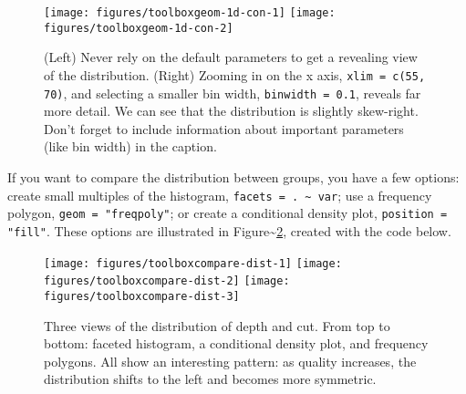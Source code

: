 \begin{figure}
\texttt{[image: figures/toolboxgeom-1d-con-1]} \texttt{[image: figures/toolboxgeom-1d-con-2]} \caption{(Left) Never rely on the default parameters to get a revealing view of the distribution.  (Right) Zooming in on the x axis, \texttt{xlim = c(55, 70)}, and selecting a smaller bin width, \texttt{binwidth = 0.1}, reveals far more detail. We can see that the distribution is slightly skew-right. Don't forget to include information about important parameters (like bin width) in the caption.\label{fig:geom-1d-con}}
\end{figure}

If you want to compare the distribution between groups, you have a few
options: create small multiples of the histogram,
\texttt{facets = . \textasciitilde{} var}; use a frequency polygon,
\texttt{geom = "freqpoly"}; or create a conditional density plot,
\texttt{position = "fill"}. These options are illustrated in
Figure\textasciitilde{}\ref{fig:compare-dist}, created with the code
below.  
 

\begin{Shaded}
\begin{Highlighting}[]
\StringTok{ }\StringTok{ }\NormalTok{(}\NormalTok{, }\NormalTok{)}
\StringTok{ }
\StringTok{  }\NormalTok{(}\NormalTok{(}  \NormalTok{) +}
\StringTok{  }\StringTok{ }
\StringTok{ }\NormalTok{(}\NormalTok{(}  \NormalTok{, }
   \NormalTok{)}
\StringTok{ }\NormalTok{(}\NormalTok{(}  
   \NormalTok{) }
\end{Highlighting}
\end{Shaded}

\begin{figure}
\texttt{[image: figures/toolboxcompare-dist-1]} \texttt{[image: figures/toolboxcompare-dist-2]} \texttt{[image: figures/toolboxcompare-dist-3]} \caption{Three views of the distribution of depth and cut. From top to bottom: faceted histogram, a conditional density plot, and frequency polygons. All show an interesting pattern: as quality increases, the distribution shifts to the left and becomes more symmetric.\label{fig:compare-dist}}
\end{figure}


